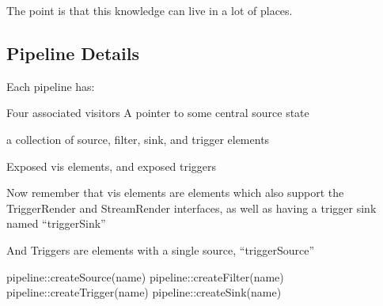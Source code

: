The point is that this knowledge can live in a lot of places. 

\subsection{Pipeline Details}

Each pipeline has: 

Four associated visitors
A pointer to some central source state

a collection of source, filter, sink, and trigger elements

Exposed vis elements, and exposed triggers

Now remember that vis elements are elements which also support the
TriggerRender and StreamRender interfaces, as well as having
a trigger sink named ``triggerSink''

And Triggers are elements with a single source, ``triggerSource''

pipeline::createSource(name)
pipeline::createFilter(name)
pipeline::createTrigger(name)
pipeline::createSink(name)

